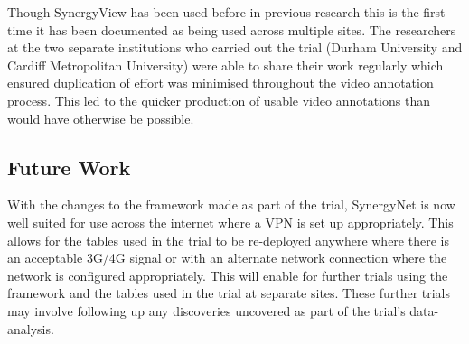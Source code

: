 \documentclass[a4paper,11pt]{article}
\begin{document}
Though SynergyView has been used before in previous research this is the first time it has been documented as being used across multiple sites.
The researchers at the two separate institutions who carried out the trial (Durham University and Cardiff Metropolitan University) were able to share their work regularly which ensured duplication of effort was minimised throughout the video annotation process.
This led to the quicker production of usable video annotations than would have otherwise be possible.

\subsection{Future Work}

With the changes to the framework made as part of the trial, SynergyNet is now well suited for use across the internet where a VPN is set up appropriately.
This allows for the tables used in the trial to be re-deployed anywhere where there is an acceptable 3G/4G signal or with an alternate network connection where the network is configured appropriately.
This will enable for further trials using the framework and the tables used in the trial at separate sites.
These further trials may involve following up any discoveries uncovered as part of the trial's data-analysis.



\end{document}
